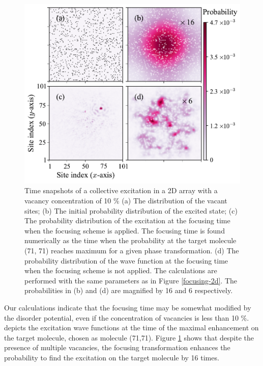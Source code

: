 \begin{figure}[htbp]
\centering
\includegraphics[width=\linewidth]{focusing-with-vacancy.pdf}
\caption{  Time snapshots of a collective excitation in a 2D
array with a vacancy concentration of 10 \%  (a) The distribution of the vacant sites; (b) The initial probability distribution of the excited state; (c) The probability distribution of the excitation at the
focusing time when the focusing scheme is applied. The focusing
time is  found numerically as  the time when the probability at the target
molecule (71, 71) reaches maximum  for a given phase transformation. (d) The probability
distribution of the wave function at the focusing time when the
focusing scheme is not applied. The calculations are performed
with the same parameters as in Figure \ref{focusing-2d}. The
probabilities in (b) and (d) are magnified by 16 and 6
respectively. } \label{focusing-with-vacancy}
\end{figure}

Our calculations indicate that the focusing time may be somewhat modified by the disorder potential, even if the
 concentration of vacancies is less than 10 \%.  depicts the excitation wave functions
 at the time of the maximal enhancement on the target molecule, chosen as molecule (71,71).  Figure \ref{focusing-with-vacancy} shows that
despite the presence of multiple vacancies, the focusing transformation enhances the probability to find the
excitation on the target molecule by 16 times.



